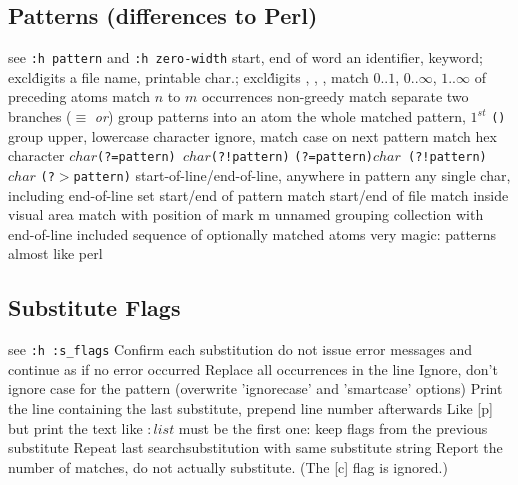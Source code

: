 \subsection{Patterns (differences to Perl)}	{see {\tt :h pattern} and {\tt :h zero-width} }
\cmdOper{\bs$<$ \bs$>$ }	{start, end of word}
	{an identifier, keyword; excl\. digits}
	{a file name, printable char.; excl\. digits}
	{, , \key{\enter}, \key{$\gets$}}
\cmdOper{\bs = * \bs + }	{match $0..1$, $0..\infty$, $1..\infty$ of preceding atoms}
	{match $n$ to $m$ occurrences}
\cmdOper{\bs$\{-\}$ }	{non-greedy match}
\cmdOper{\bs$|$ }	{separate two branches ($\equiv$ {\it or\/})}
\cmdOper{\bs( \bs) }	{group patterns into an atom}
	{the whole matched pattern, $1^{st}$ {\tt()} group}
	{upper, lowercase character}
	{ignore, match case on next pattern}
	{match hex character}
	{\tt $char$(?=pattern) $char$(?!pattern)\rm}
	{\tt (?=pattern)$char$ (?!pattern)$char$\rm}
	{\tt (?$>$pattern)\rm }
\cmdOper{\bs\_\^{} \bs\_\$ }	{start-of-line/end-of-line, anywhere in pattern}
	{any single char, including end-of-line}
	{set start/end of pattern}
\cmdOper{\bs \%\^{} \bs\%\$ }	{match start/end of file}
	{match inside visual area}
	{match with position of mark m}
\cmdOper{\bs\%(\bs) }	{unnamed grouping}
\cmdOper{\bs\_$[$ $]$ }	{collection with end-of-line included}
\cmdOper{\bs\%$[$ $]$ }	{sequence of optionally matched atoms}
	{very magic: patterns almost like perl}

\subsection{Substitute Flags}	{see {\tt :h :s\_flags}}
	{Confirm each substitution}
	{ do not issue error messages and continue as if no error occurred}
	{Replace all occurrences in the line}
	{Ignore, don't ignore case for the pattern (overwrite 'ignorecase' and 'smartcase' options)}
	{Print the line containing the last substitute, prepend line number afterwards}
	{Like [p] but print the text like $:list$}
\cmdOper{\&}	{must be the first one: keep flags from the previous substitute}
	{Repeat last search\or substitution with same substitute string}
	{Report the number of matches, do not actually substitute.  (The [c] flag is ignored.) }

